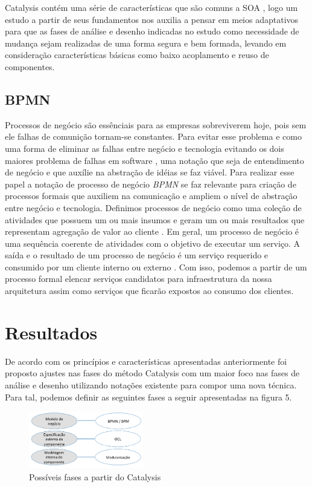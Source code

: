 \documentclass[
	article,			%
	11pt,				%
	oneside,			%
	a4paper,			%
	english,			%
	brazil,				%
	sumario=tradicional
	]{abntex2}
\begin{document}
Catalysis contém uma série de características que são comuns a SOA , logo um estudo a partir de seus fundamentos nos auxilia a pensar em meios adaptativos para que as fases de análise e desenho indicadas no estudo como necessidade de mudança sejam realizadas de uma forma segura e bem formada, levando em consideração características básicas como baixo acoplamento e reuso de componentes.

\subsection{BPMN}

Processos de negócio são essênciais para as empresas sobreviverem hoje, pois sem ele falhas de comunição tornam-se constantes. Para evitar esse problema e como uma forma de eliminar as falhas entre negócio e tecnologia evitando os dois maiores problema de falhas em software \cite{International2013}, uma notação que seja de entendimento de negócio e que auxílie na abstração de idéias se faz viável. Para realizar esse papel a notação de processo de negócio \textit{BPMN} se faz relevante para criação de processos formais que auxiliem na comunicação e ampliem o nível de abstração entre negócio e tecnologia. Definimos processos de negócio como uma coleção de atividades que possuem um ou mais insumos e geram um ou mais resultados que representam agregação de valor ao cliente \cite{Hammer2009}. Em geral, um processo de negócio é uma sequência coerente de atividades com o objetivo de executar um serviço. A saída e o resultado de um processo de negócio é um serviço requerido e consumido por um cliente interno ou externo \cite{Scheer1998}.
Com isso, podemos a partir de um processo formal elencar serviços candidatos para infraestrutura da nossa arquitetura assim como serviços que ficarão expostos ao consumo dos clientes.


\section{Resultados}

De acordo com os princípios e características apresentadas anteriormente foi proposto ajustes nas fases do método Catalysis com um maior foco nas fases de análise e desenho utilizando notações existente para compor uma nova técnica. Para tal, podemos definir as seguintes fases a seguir apresentadas na figura 5.
\begin{figure}[h]
	 \centering 
     \includegraphics[width=5cm]{Images/fig5.png}
     \caption{Possíveis fases a partir do Catalysis}
     \label{Possíveis fases a partir do Catalysis}
\end{figure}
\end{document}
